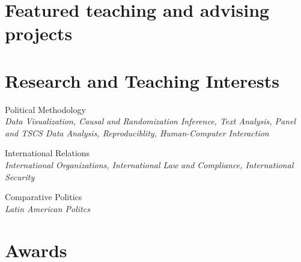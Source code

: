 \documentclass[margin, 10pt]{CVStyleTemplate}\usepackage[]{graphicx}\usepackage[dvipsnames]{xcolor}
\begin{document}
\begin{resume}

\section{Featured teaching and advising projects}

\section{Research and Teaching Interests}

Political Methodology\\
\emph{Data Visualization, Causal and Randomization Inference, Text Analysis, Panel and TSCS Data Analysis, Reproduciblity, Human-Computer Interaction}

International Relations\\
\emph{International Organizations, International Law and Compliance, International Security}

Comparative Politics\\
\emph{Latin American Politcs}

\section{Awards}%


\end{resume}
\end{document}

